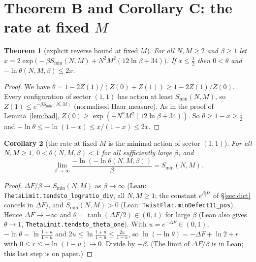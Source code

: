 \documentclass[11pt,a4paper]{article}
\newtheorem{theorem}{Theorem}
\newtheorem{corollary}[theorem]{Corollary}
\theoremstyle{definition}
\theoremstyle{remark}
\newcommand{\code}[1]{\texttt{#1}}
\begin{document}
\section{Theorem B and Corollary C: the rate at fixed $M$}\label{sec:B}

\begin{theorem}[explicit reverse bound at fixed $M$]\label{thm:B}
For all $N,M\ge2$ and $\beta\ge1$ let $x=2\exp\big(-\beta S_{\min}(N,M)+N^2M^2(12\ln\beta+34)\big)$. If $x\le\frac12$ then $0<\theta$ and $-\ln\theta(N,M,\beta)\le2x$.
\end{theorem}
\begin{proof}
We have $\theta=1-2Z(1)/(Z(0)+Z(1))\ge1-2Z(1)/Z(0)$.
Every configuration of sector $(1,1)$ has action at least $S_{\min}(N,M)$, so $Z(1)\le e^{-\beta S_{\min}(N,M)}$ (normalised Haar measure).
As in the proof of Lemma~\ref{lem:bad}, $Z(0)\ge\exp(-N^2M^2(12\ln\beta+34))$.
So $\theta\ge1-x\ge\frac12$ and $-\ln\theta\le-\ln(1-x)\le x/(1-x)\le2x$.
\end{proof}

\begin{corollary}[the rate at fixed $M$ is the minimal action of sector $(1,1)$]\label{cor:C}
For all $N,M\ge1$, $0<\theta(N,M,\beta)<1$ for all sufficiently large $\beta$, and
\[ \lim_{\beta\to\infty}\frac{-\ln(-\ln\theta(N,M,\beta))}{\beta}=S_{\min}(N,M). \]
\end{corollary}
\begin{proof}
$\Delta F/\beta\to S_{\min}(N,M)$ as $\beta\to\infty$ (Lean: \code{ThetaLimit.tendsto\_logratio\_div}, all $N,M\ge1$; the constant $e^{\beta|P|}$ of \S\ref{sec:dict} cancels in $\Delta F$), and $S_{\min}(N,M)>0$ (Lean: \code{TwistFlat.minDefect11\_pos}). Hence $\Delta F\to+\infty$ and $\theta=\tanh(\Delta F/2)\in(0,1)$ for large $\beta$ (Lean also gives $\theta\to1$, \code{ThetaLimit.tendsto\_theta\_one}).
With $u=e^{-\Delta F}\in(0,1)$, $-\ln\theta=\ln\frac{1+u}{1-u}$ and $2u\le\ln\frac{1+u}{1-u}\le\frac{2u}{1-u}$, so $\ln(-\ln\theta)=-\Delta F+\ln2+r$ with $0\le r\le-\ln(1-u)\to0$. Divide by $-\beta$. (The limit of $\Delta F/\beta$ is in Lean; this last step is on paper.)
\end{proof}
\end{document}
